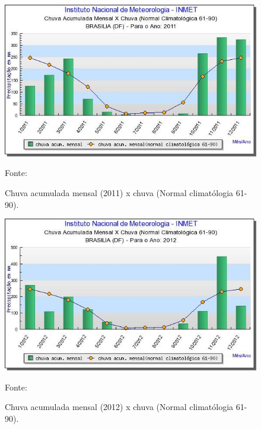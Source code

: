 \begin{figure}[H]
	 \centering
	\label{Chuva acumulada mensal (2011) x chuva (Normal climatólogia 61-90)}
	 \includegraphics[scale=0.6]{captacao/1.jpg}
	 \caption{Chuva acumulada mensal (2011) x chuva (Normal climatólogia 61-90).}
	 \small{Fonte: \cite{INMET}}
\end{figure}
 
 
\begin{figure}[H]
	 \centering
	\label{Chuva acumulada mensal (2012) x chuva (Normal climatólogia 61-90)}
	 \includegraphics[scale=0.6]{captacao/2.jpg}
	 \caption{Chuva acumulada mensal (2012) x chuva (Normal climatólogia 61-90).}
	\small{Fonte: \cite{INMET}}
\end{figure}

